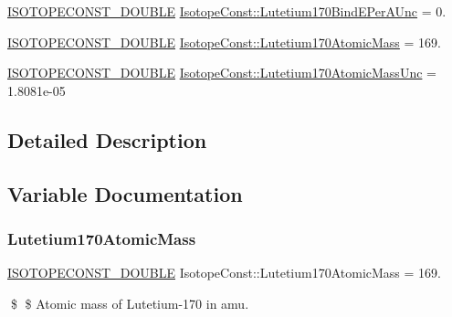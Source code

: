 \begin{DoxyCompactItemize}
\mbox{\hyperlink{group___isotope_const-_macros_ga8f45a7272ce02c0b4c65c44636ed719a}{I\+S\+O\+T\+O\+P\+E\+C\+O\+N\+S\+T\+\_\+\+D\+O\+U\+B\+LE}} \mbox{\hyperlink{group___isotope_const-_lutetium-_lu170_ga22f15cb403e51f2917f799b31d5b16ff}{Isotope\+Const\+::\+Lutetium170\+Bind\+E\+Per\+A\+Unc}} = 0.
\item 
\mbox{\hyperlink{group___isotope_const-_macros_ga8f45a7272ce02c0b4c65c44636ed719a}{I\+S\+O\+T\+O\+P\+E\+C\+O\+N\+S\+T\+\_\+\+D\+O\+U\+B\+LE}} \mbox{\hyperlink{group___isotope_const-_lutetium-_lu170_ga698bf26ba7d346dd43f0e55a129b5bd9}{Isotope\+Const\+::\+Lutetium170\+Atomic\+Mass}} = 169.
\item 
\mbox{\hyperlink{group___isotope_const-_macros_ga8f45a7272ce02c0b4c65c44636ed719a}{I\+S\+O\+T\+O\+P\+E\+C\+O\+N\+S\+T\+\_\+\+D\+O\+U\+B\+LE}} \mbox{\hyperlink{group___isotope_const-_lutetium-_lu170_ga7f7389b5fc297ce65abaabaa1a451f62}{Isotope\+Const\+::\+Lutetium170\+Atomic\+Mass\+Unc}} = 1.\+8081e-\/05
\end{DoxyCompactItemize}


\subsection{Detailed Description}


\subsection{Variable Documentation}
\mbox{\label{group___isotope_const-_lutetium-_lu170_ga698bf26ba7d346dd43f0e55a129b5bd9}} 
\subsubsection{\texorpdfstring{Lutetium170\+Atomic\+Mass}{Lutetium170AtomicMass}}
{\footnotesize\ttfamily \mbox{\hyperlink{group___isotope_const-_macros_ga8f45a7272ce02c0b4c65c44636ed719a}{I\+S\+O\+T\+O\+P\+E\+C\+O\+N\+S\+T\+\_\+\+D\+O\+U\+B\+LE}} Isotope\+Const\+::\+Lutetium170\+Atomic\+Mass = 169.}

\$ \$ Atomic mass of Lutetium-\/170 in amu. \mbox{\label{group___isotope_const-_lutetium-_lu170_ga7f7389b5fc297ce65abaabaa1a451f62}} 
